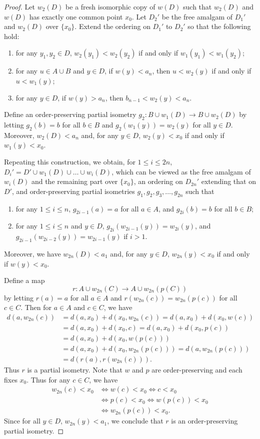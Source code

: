 \documentclass{amsart}
\theoremstyle{definition}
\theoremstyle{remark}
\begin{document}
\begin{proof}
Let $w_2(D)$ be a fresh isomorphic copy of $w(D)$ such that $w_2(D)$ and $w(D)$ has exactly one common point $x_0$. Let $D_2'$ be the free amalgam of $D_1'$ and $w_2(D)$ over $\{x_0\}$. Extend the ordering on $D_1'$ to $D_2'$ so that the following hold:
 \begin{enumerate}
       \item[(d)] for any $y_1,y_2 \in D$, $w_2(y_1) < w_2(y_2)$ if and only if $w_1(y_1) < w_1(y_2)$;
       \item[(e)] for any $u \in A \cup B$ and $y \in D$, if $w(y) < a_n$, then $u<w_2(y)$ if and only if $u<w_1(y)$;
       \item[(f)] for any $y \in D$, if $w(y) > a_n$, then $b_{n-1} < w_2(y) <a_n$. 
    \end{enumerate}
Define an order-preserving partial isometry $g_2\colon B\cup w_1(D)\to B\cup w_2(D)$ by letting $g_2(b)=b$ for all $b\in B$ and $g_2(w_1(y))=w_2(y)$ for all $y\in D$. Moreover, $w_2(D) < a_n$ and, for any $y \in D$, $w_2(y) <x_0$ if and only if $w_1(y)<x_0$.
    
Repeating this construction, we obtain, for $1\leq i \leq 2n$, $D_i'=D' \cup w_1(D) \cup \dots \cup w_i(D)$, which can be viewed as the free amalgam of $w_i(D)$ and the remaining part over $\{x_0\}$, an ordering on $D_{2n}'$ extending that on $D'$, and order-preserving partial isometries $g_1, g_2, g_3, \dots,g_{2n}$ such that 
\begin{enumerate}
\item[(i)] for any $1\leq i\leq n$, $g_{2i-1}(a)=a$ for all $a\in A$, and $g_{2i}(b)=b$ for all $b\in B$;
\item[(ii)] for any $1\leq i\leq n$ and $y\in D$, $g_{2i}(w_{2i-1}(y))=w_{2i}(y)$, and $g_{2i-1}(w_{2i-2}(y))=w_{2i-1}(y)$ if $i>1$.
\end{enumerate}
Moreover, we have $w_{2n}(D) <a_1$ and, for any $y \in D$, $w_{2n}(y) <x_0$ if and only if $w(y)<x_0$. 

Define a map $$r\colon A\cup w_{2n}(C)\to A\cup w_{2n}(p(C))$$ by letting $r(a)=a$ for all $a\in A$ and $r(w_{2n}(c))=w_{2n}(p(c))$ for all $c\in C$. Then for $a \in A$ and $c \in C$,  we have
    \begin{align*}
    d(a,w_{2n}(c)) &=d(a,x_0)+d(x_0,w_{2n}(c))=d(a,x_0)+d(x_0,w(c))\\&=d(a,x_0)+d(x_0,c)=d(a,x_0)+d(x_0,p(c))\\&=d(a,x_0)+d(x_0,w(p(c))) \\
& =d(a,x_0)+d(x_0,w_{2n}(p(c)))=d(a,w_{2n}(p(c))) \\
&=d(r(a),r(w_{2n}(c))).
    \end{align*} 
Thus $r$ is a partial isometry. Note that $w$ and $p$ are order-preserving and each fixes $x_0$. Thus for any $c\in C$, we have 
    \begin{align*}
      w_{2n}(c)<x_0 &\iff w(c)<x_0 \iff c<x_0 \\&\iff p(c) <x_0 \iff w(p(c))<x_0 \\&\iff w_{2n}(p(c))<x_0. 
    \end{align*}
    Since for all $y \in D$, $w_{2n}(y)<a_1$, we conclude that $r$ is an order-preserving partial isometry. 




\end{proof}
\end{document}
